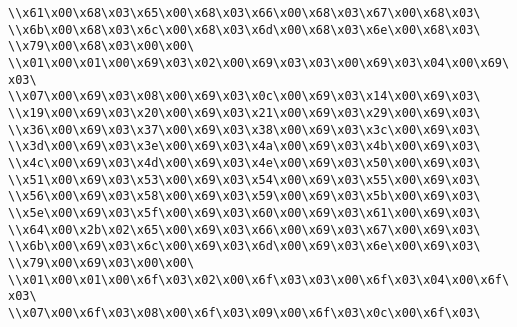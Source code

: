 \verb|\\x61\x00\x68\x03\x65\x00\x68\x03\x66\x00\x68\x03\x67\x00\x68\x03\|\newline
\verb|\\x6b\x00\x68\x03\x6c\x00\x68\x03\x6d\x00\x68\x03\x6e\x00\x68\x03\|\newline
\verb|\\x79\x00\x68\x03\x00\x00\|\newline
\verb|\\x01\x00\x01\x00\x69\x03\x02\x00\x69\x03\x03\x00\x69\x03\x04\x00\x69\x03\|\newline
\verb|\\x07\x00\x69\x03\x08\x00\x69\x03\x0c\x00\x69\x03\x14\x00\x69\x03\|\newline
\verb|\\x19\x00\x69\x03\x20\x00\x69\x03\x21\x00\x69\x03\x29\x00\x69\x03\|\newline
\verb|\\x36\x00\x69\x03\x37\x00\x69\x03\x38\x00\x69\x03\x3c\x00\x69\x03\|\newline
\verb|\\x3d\x00\x69\x03\x3e\x00\x69\x03\x4a\x00\x69\x03\x4b\x00\x69\x03\|\newline
\verb|\\x4c\x00\x69\x03\x4d\x00\x69\x03\x4e\x00\x69\x03\x50\x00\x69\x03\|\newline
\verb|\\x51\x00\x69\x03\x53\x00\x69\x03\x54\x00\x69\x03\x55\x00\x69\x03\|\newline
\verb|\\x56\x00\x69\x03\x58\x00\x69\x03\x59\x00\x69\x03\x5b\x00\x69\x03\|\newline
\verb|\\x5e\x00\x69\x03\x5f\x00\x69\x03\x60\x00\x69\x03\x61\x00\x69\x03\|\newline
\verb|\\x64\x00\x2b\x02\x65\x00\x69\x03\x66\x00\x69\x03\x67\x00\x69\x03\|\newline
\verb|\\x6b\x00\x69\x03\x6c\x00\x69\x03\x6d\x00\x69\x03\x6e\x00\x69\x03\|\newline
\verb|\\x79\x00\x69\x03\x00\x00\|\newline
\verb|\\x01\x00\x01\x00\x6f\x03\x02\x00\x6f\x03\x03\x00\x6f\x03\x04\x00\x6f\x03\|\newline
\verb|\\x07\x00\x6f\x03\x08\x00\x6f\x03\x09\x00\x6f\x03\x0c\x00\x6f\x03\|\newline
